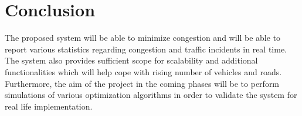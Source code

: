 \documentclass[openany,12pt]{report}
\begin{document}
	\chapter{Conclusion}
	\hspace*{0.5in}The proposed system will be able to minimize congestion and will be able to report various statistics regarding congestion and traffic incidents in real time. The system also provides sufficient scope for scalability and additional functionalities which will help cope with rising number of vehicles and roads. 
	Furthermore, the aim of the project in the coming phases will be to perform simulations of various optimization algorithms in order to validate the system for real life implementation.
	

\end{document}
